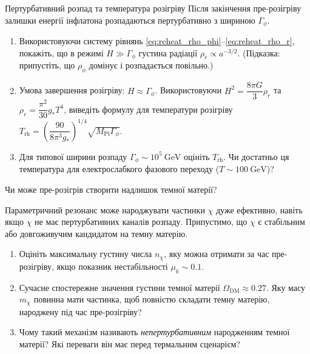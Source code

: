 
\begin{problem}{Пертурбативний розпад та температура розігріву}
Після закінчення пре-розігріву залишки енергії інфлатона розпадаються
пертурбативно з шириною $\Gamma_\phi$.

\begin{enumerate}
    \item Використовуючи систему рівнянь \eqref{eq:reheat_rho_phi}--\eqref{eq:reheat_rho_r},
          покажіть, що в режимі $H \gg \Gamma_\phi$ густина радіації
          $\rho_r \propto a^{-3/2}$. (Підказка: припустіть, що $\rho_\phi$ домінує
          і розпадається повільно.)
    \item Умова завершення розігріву: $H \approx \Gamma_\phi$. Використовуючи
          $H^2 = \dfrac{8\pi G}{3}\rho_r$ та $\rho_r = \dfrac{\pi^2}{30}g_* T^4$,
          виведіть формулу для температури розігріву $T_{\mathrm{rh}} =
          \left(\dfrac{90}{8\pi^3 g_*}\right)^{1/4} \sqrt{M_{\mathrm{Pl}}\Gamma_\phi}$.
    \item Для типової ширини розпаду $\Gamma_\phi \sim 10^5\ \text{GeV}$ оцініть $T_{\mathrm{rh}}$.
          Чи достатньо ця температура для електрослабкого фазового переходу ($T \sim 100\ \text{GeV}$)?
\end{enumerate}
\end{problem}


\begin{problem}{Чи може пре-розігрів створити надлишок темної матерії?}

Параметричний резонанс може народжувати частинки $\chi$ дуже ефективно,
навіть якщо $\chi$ не має пертурбативних каналів розпаду. Припустимо,
що $\chi$ є стабільним або довгоживучим кандидатом на темну матерію.

\begin{enumerate}
    \item Оцініть максимальну густину числа $n_\chi$, яку можна отримати
          за час пре-розігріву, якщо показник нестабільності $\mu_k \sim 0.1$.
    \item Сучасне спостережне значення густини темної матерії $\Omega_{\mathrm{DM}} \approx 0.27$.
          Яку масу $m_\chi$ повинна мати частинка, щоб повністю складати темну матерію,
          народжену під час пре-розігріву?
    \item Чому такий механізм називають \emph{непертурбативним} народженням темної матерії?
          Які переваги він має перед термальним сценарієм?
\end{enumerate}
\end{problem}